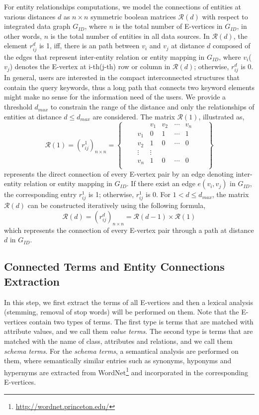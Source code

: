 For entity relationships computations, we model the connections of entities at various distances $d$
as $n\times n$ symmetric boolean matrices $\mathcal{R}(d)$  with respect to integrated data graph
$G_{ID}$, where $n$ is the total number of E-vertices in $G_{ID}$, in other words, $n$ is the total
number of entities in all data sources. In $\mathcal{R}(d)$, the element $r^d_{ij}$ is 1, iff, there
is an path between $v_i$ and $v_j$ at distance $d$ composed of the edges that represent inter-entity
relation or entity mapping in $G_{ID}$, where $v_i$($v_j$) denotes the E-vertex at i-th(j-th) row or
column in $\mathcal{R}(d)$; otherwise, $r^d_{ij}$ is 0. In general, users are interested in the
compact interconnected structures that contain the query keywords, thus a long path that connects two
keyword elements might make no sense for the information need of the users. We provide a threshold
$d_{max}$ to constrain the range of the distance and only the relationships of entities at distance
$d \leq d_{max}$ are considered. The matrix $\mathcal{R}(1)$, illustrated as,
\[\mathcal{R}(1) = (r^1_{ij})_{n \times n} = \begin{Bmatrix} 
     \quad & \quad & v_1 & v_2 & \cdots & v_n & \quad\\ 
     \quad & v_1 & 0 & 1 & \cdots & 1 & \quad\\ 
     \quad & v_2 & 1 & 0 & \cdots & 0 & \quad\\ 
     \quad & \vdots & \vdots & \quad \\
     \quad & v_n & 1 & 0 & \cdots & 0 & \quad\\ 
\end{Bmatrix}\]
represents the direct connection of every E-vertex pair by an edge denoting inter-entity relation or
entity mapping in $G_{ID}$. If there exist an edge $e(v_i,v_j)$ in $G_{ID}$, the corresponding entry
$r^1_{ij}$ is 1; otherwise, $r^1_{ij}$ is 0. For $1 < d \leq d_{max}$, the matrix $\mathcal{R}(d)$
can be constructed iteratively using the following formula, 
\[\mathcal{R}(d) = (r^d_{ij})_{n \times n} = \mathcal{R}(d-1) \times \mathcal{R}(1)\] which
represents the connection of every E-vertex pair through a path at distance $d$ in $G_{ID}$.

\subsection{Connected Terms and Entity Connections Extraction}

In this step, we first extract the terms of all E-vertices and then a lexical analysis (stemming,
removal of stop words) will be performed on them. Note that the E-vertices contain two types of
terms. The first type is terms that are matched with attribute values, and we call them \emph{value
terms}. The second type is terms that are matched with the name of class, attributes and relations,
and we call them \emph{schema terms}. For the \emph{schema terms}, a semantical analysis are
performed on them, where semantically similar entries such as synonyms, hyponyms and hypernyms are
extracted from WordNet\footnote{\url{http://wordnet.princeton.edu/}} \citep{wordnet} and
incorporated in the corresponding E-vertices.

